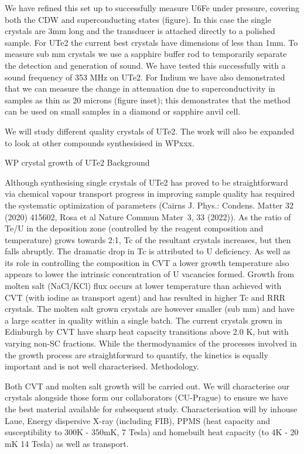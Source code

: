 We have refined this set up to successfully measure U6Fe under pressure, covering both the CDW and superconducting states (figure). In this case the single crystals are 3mm long and the transducer is attached directly to a polished sample. For UTe2 the current best crystals have dimensions of less than 1mm. To measure sub mm crystals we use a sapphire buffer rod to temporarily separate the detection and generation of sound. We have tested this successfully with a sound frequency of 353 MHz on UTe2. For Indium we have also demonstrated that we can measure the change in attenuation due to superconductivity in samples as thin as 20 microns (figure inset); this demonstrates that the method can be used on small samples in a diamond or sapphire anvil cell.

We will study different quality crystals of UTe2.  The work will also be expanded to look at other compounds synthesisised in WPxxx. 

WP crystal growth of UTe2
Background

Although synthesising single crystals of UTe2 has proved to be straightforward via chemical vapour transport progress in improving sample quality has required the systematic optimization of parameters (Cairns J. Phys.: Condens. Matter 32 (2020) 415602, Rosa et al Nature Commun Mater 3, 33 (2022)). As the ratio of Te/U in the deposition zone (controlled by the reagent composition and temperature) grows towards 2:1, Tc of the resultant crystals increases, but then falls abruptly. The dramatic drop in Tc is attributed to U deficiency. As well as its role in controlling the composition in CVT a lower growth temperature also appears to lower the intrinsic concentration of U vacancies formed. Growth from molten salt (NaCl/KCl) flux occurs at lower temperature than achieved with CVT (with iodine as transport agent) and has resulted in higher Tc and RRR crystals. The molten salt grown crystals are however smaller (sub mm) and have a large scatter in quality within a single batch. The current crystals grown in Edinburgh by CVT have sharp heat capacity transitions above 2.0 K, but with varying non-SC fractions. While the thermodynamics of the processes involved in the growth process are straightforward to quantify, the kinetics is equally important and is not well characterised.
Methodology.

Both CVT and molten salt growth will be carried out. We will characterise our crystals alongside those form our collaborators (CU-Prague) to ensure we have the best material available for subsequent study. Characterisation will  by inhouse Laue, Energy dispersive X-ray (including FIB), PPMS (heat capacity and susceptibility to 300K - 350mK, 7 Tesla) and homebuilt heat capacity (to 4K - 20 mK 14 Tesla) as well as transport.

